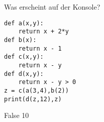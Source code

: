 \question[4] Was erscheint auf der Konsole?  
\begin{lstlisting}
def a(x,y):
    return x + 2*y
def b(x):
    return x - 1
def c(x,y):
    return x - y
def d(x,y):
    return x - y > 0
z = c(a(3,4),b(2))
print(d(z,12),z)
\end{lstlisting}
\begin{solutionbox}{1cm}
 False 10
\end{solutionbox}
